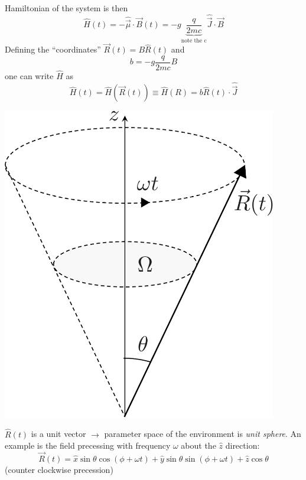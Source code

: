 \documentclass[12pt]{article}
\newcommand{\be}{\begin{equation}}
\newcommand{\ee}{\end{equation}}
\begin{document}
\begin{minipage}{0.6\textwidth}
\setcounter{equation}{77}
Hamiltonian of the system is then
\be
\hat{H}(t)=-\hat{\vec{\mu}} \cdot \vec{B}(t)=-g \underbrace{\frac{q}{2 m c}}_{\text{note the c}} \hat{\vec{J}} \cdot \vec{B}
\ee	
Defining the ``coordinates'' $\vec{R}(t)=B \hat{R}(t)$ and
\be
b=-g \frac{q}{2 m c} B
\ee
one can write $\hat{H}$ as
\be
\hat{H}(t)=\hat{H}(\vec{R}(t)) \equiv \hat{H}(R)=b \hat{R}(t) \cdot \hat{\vec{J}}
\label{eq:g80}
\ee
\end{minipage}%
\begin{minipage}{0.4\textwidth}
\hfill\includegraphics[width=0.9\textwidth]{Figures/RotatingVector-crop.pdf}
\end{minipage}

$\hat{R}(t)$ is a unit vector $\rightarrow$ parameter space of the
environment is \emph{unit sphere}.
An example is the field precessing with
frequency $\omega$ about the $\hat{z}$ direction:
\be
\vec{R}(t)=\hat{x} \sin \theta \cos (\phi+\omega t)+ \hat{y} \sin \theta \sin (\phi+\omega t)+\hat{z} \cos \theta
\label{eq:g81}
\ee
(counter clockwise precession)

\end{document}
